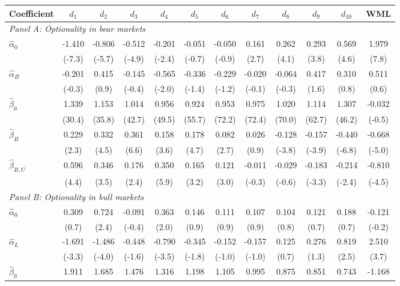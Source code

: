 \begin{tabular}{lccccccccccc}
\toprule
Coefficient & $d_{1}$ & $d_{2}$ & $d_{3}$ & $d_{4}$ & $d_{5}$ & $d_{6}$ & $d_{7}$ & $d_{8}$ & $d_{9}$ & $d_{10}$ & WML \\
\midrule
\multicolumn{12}{l}{\textit{Panel A: Optionality in bear markets}} \\
\midrule
$\hat\alpha_0$ & -1.410 & -0.806 & -0.512 & -0.201 & -0.051 & -0.050 & 0.161 & 0.262 & 0.293 & 0.569 & 1.979 \\
 & (-7.3) & (-5.7) & (-4.9) & (-2.4) & (-0.7) & (-0.9) & (2.7) & (4.1) & (3.8) & (4.6) & (7.8) \\
$\hat\alpha_B$ & -0.201 & 0.415 & -0.145 & -0.565 & -0.336 & -0.229 & -0.020 & -0.064 & 0.417 & 0.310 & 0.511 \\
 & (-0.3) & (0.9) & (-0.4) & (-2.0) & (-1.4) & (-1.2) & (-0.1) & (-0.3) & (1.6) & (0.8) & (0.6) \\
$\hat\beta_0$ & 1.339 & 1.153 & 1.014 & 0.956 & 0.924 & 0.953 & 0.975 & 1.020 & 1.114 & 1.307 & -0.032 \\
 & (30.4) & (35.8) & (42.7) & (49.5) & (55.7) & (72.2) & (72.4) & (70.0) & (62.7) & (46.2) & (-0.5) \\
$\hat\beta_B$ & 0.229 & 0.332 & 0.361 & 0.158 & 0.178 & 0.082 & 0.026 & -0.128 & -0.157 & -0.440 & -0.668 \\
 & (2.3) & (4.5) & (6.6) & (3.6) & (4.7) & (2.7) & (0.9) & (-3.8) & (-3.9) & (-6.8) & (-5.0) \\
$\hat\beta_{B,U}$ & 0.596 & 0.346 & 0.176 & 0.350 & 0.165 & 0.121 & -0.011 & -0.029 & -0.183 & -0.214 & -0.810 \\
 & (4.4) & (3.5) & (2.4) & (5.9) & (3.2) & (3.0) & (-0.3) & (-0.6) & (-3.3) & (-2.4) & (-4.5) \\
\midrule
\multicolumn{12}{l}{\textit{Panel B: Optionality in bull markets}} \\
\midrule
$\hat\alpha_0$ & 0.309 & 0.724 & -0.091 & 0.363 & 0.146 & 0.111 & 0.107 & 0.104 & 0.121 & 0.188 & -0.121 \\
 & (0.7) & (2.4) & (-0.4) & (2.0) & (0.9) & (0.9) & (0.9) & (0.8) & (0.7) & (0.7) & (-0.2) \\
$\hat\alpha_L$ & -1.691 & -1.486 & -0.448 & -0.790 & -0.345 & -0.152 & -0.157 & 0.125 & 0.276 & 0.819 & 2.510 \\
 & (-3.3) & (-4.0) & (-1.6) & (-3.5) & (-1.8) & (-1.0) & (-1.0) & (0.7) & (1.3) & (2.5) & (3.7) \\
$\hat\beta_0$ & 1.911 & 1.685 & 1.476 & 1.316 & 1.198 & 1.105 & 0.995 & 0.875 & 0.851 & 0.743 & -1.168 \\

\end{tabular}
